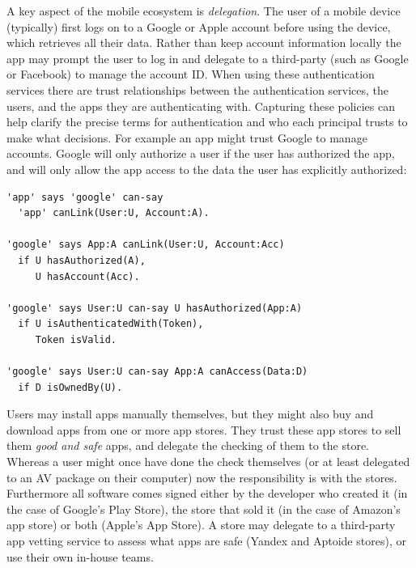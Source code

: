 \documentclass[thesis.tex]{subfiles}
\begin{document}
A key aspect of the mobile ecosystem is \emph{delegation}. The user of a mobile
device (typically) first logs on to a Google or Apple account before using the
device, which retrieves all their data. Rather than keep account information
locally the app may prompt the user to log in and delegate to a third-party
(such as Google or Facebook) to manage the account ID. When using these
authentication services there are trust relationships between the authentication
services, the users, and the apps they are authenticating with. Capturing these
policies can help clarify the precise terms for authentication and who each principal
trusts to make what decisions. For example an app might trust Google to manage
accounts. Google will only authorize a user if the user has authorized the app,
and will only allow the app access to the data the user has explicitly
authorized:
\begin{lstlisting}
'app' says 'google' can-say 
  'app' canLink(User:U, Account:A).

'google' says App:A canLink(User:U, Account:Acc)
  if U hasAuthorized(A),
     U hasAccount(Acc).

'google' says User:U can-say U hasAuthorized(App:A)
  if U isAuthenticatedWith(Token),
     Token isValid.

'google' says User:U can-say App:A canAccess(Data:D)
  if D isOwnedBy(U).
\end{lstlisting}

Users may install apps manually themselves, but they might also buy and download apps from one or
more app stores.  They trust these app
stores to sell them \emph{good and safe} apps, and delegate
the checking of them to the store.  Whereas a user might once have
done the check themselves (or at least delegated to an \ac{AV} package
on their computer) now the responsibility is with the stores.
Furthermore all software comes signed either by the developer who
created it (in the case of Google's Play Store), the store that sold
it (in the case of Amazon's app store) or both (Apple's App Store).  A
store may delegate to a third-party app vetting service to assess
what apps are safe (Yandex and Aptoide stores), or use their own
in-house teams.
\end{document}
